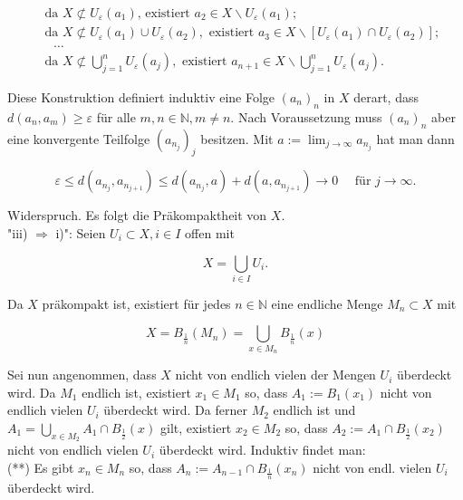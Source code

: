 \documentclass[10pt, letterpaper]{article}
\begin{document}
$$
\begin{aligned}
& \text { da } X \not \subset U_{\varepsilon}\left(a_{1}\right) \text {, existiert } a_{2} \in X \backslash U_{\varepsilon}\left(a_{1}\right) ; \\
& \text { da } X \not \subset U_{\varepsilon}\left(a_{1}\right) \cup U_{\varepsilon}\left(a_{2}\right), \text { existiert } a_{3} \in X \backslash\left[U_{\varepsilon}\left(a_{1}\right) \cap U_{\varepsilon}\left(a_{2}\right)\right] ; \\
& \quad \ldots \\
& \text { da } X \not \subset \bigcup_{j=1}^{n} U_{\varepsilon}\left(a_{j}\right), \text { existiert } a_{n+1} \in X \backslash \bigcup_{j=1}^{n} U_{\varepsilon}\left(a_{j}\right) .
\end{aligned}
$$

Diese Konstruktion definiert induktiv eine Folge $\left(a_{n}\right)_{n}$ in $X$ derart, dass $d\left(a_{n}, a_{m}\right) \geq \varepsilon$ für alle $m, n \in \mathbb{N}, m \neq n$. Nach Voraussetzung muss $\left(a_{n}\right)_{n}$ aber eine konvergente Teilfolge $\left(a_{n_{j}}\right)_{j}$ besitzen. Mit $a:=\lim _{j \rightarrow \infty} a_{n_{j}}$ hat man dann

$$
\varepsilon \leq d\left(a_{n_{j}}, a_{n_{j+1}}\right) \leq d\left(a_{n_{j}}, a\right)+d\left(a, a_{n_{j+1}}\right) \rightarrow 0 \quad \text { für } j \rightarrow \infty .
$$

Widerspruch. Es folgt die Präkompaktheit von $X$.\\
"iii) $\Longrightarrow$ i)": Seien $U_{i} \subset X, i \in I$ offen mit

$$
X=\bigcup_{i \in I} U_{i} .
$$

Da $X$ präkompakt ist, existiert für jedes $n \in \mathbb{N}$ eine endliche Menge $M_{n} \subset X$ mit

$$
X=B_{\frac{1}{n}}\left(M_{n}\right)=\bigcup_{x \in M_{n}} B_{\frac{1}{n}}(x)
$$

Sei nun angenommen, dass $X$ nicht von endlich vielen der Mengen $U_{i}$ überdeckt wird. Da $M_{1}$ endlich ist, existiert $x_{1} \in M_{1}$ so, dass $A_{1}:=B_{1}\left(x_{1}\right)$ nicht von endlich vielen $U_{i}$ überdeckt wird. Da ferner $M_{2}$ endlich ist und $A_{1}=\bigcup_{x \in M_{2}} A_{1} \cap B_{\frac{1}{2}}(x)$ gilt, existiert $x_{2} \in M_{2}$ so, dass $A_{2}:=A_{1} \cap B_{\frac{1}{2}}\left(x_{2}\right)$ nicht von endlich vielen $U_{i}$ überdeckt wird. Induktiv findet man:\\
(**) Es gibt $x_{n} \in M_{n}$ so, dass $A_{n}:=A_{n-1} \cap B_{\frac{1}{n}}\left(x_{n}\right)$ nicht von endl. vielen $U_{i}$ überdeckt wird.
\end{document}
